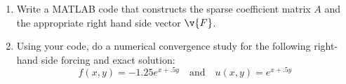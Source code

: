 \documentclass[11pt, oneside]{article}
\begin{document}
\begin{enumerate}
    \item %
        Write a MATLAB code that constructs the sparse coefficient matrix $A$
        and the appropriate right hand side vector $\v{F}$.

    \item %
        Using your code, do a numerical convergence study for the following
        right-hand side forcing and exact solution:
        \[
            f(x,y) = -1.25e^{x + .5y}\quad\text{and}\quad u(x,y) = e^{x + .5y}
        \]
\end{enumerate}
\end{document}
